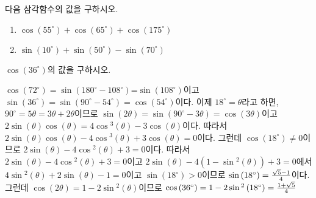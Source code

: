 \documentclass[11pt, a4paper]{book}
\begin{document}
\begin{problem}
	다음 삼각함수의 값을 구하시오.
	\begin{enumerate}[label=\arabic*)]
		\item $\cos(55^{\circ}) + \cos(65^{\circ}) + \cos(175^{\circ})$
		\item $\sin(10^{\circ}) + \sin(50^{\circ}) - \sin(70^{\circ})$
	\end{enumerate}
\end{problem}


\begin{problem}
	$\cos(36^{\circ})$의 값을 구하시오.
	{
\begin{psolution}
	$\cos\left(72^{\circ}\right)=\sin\left(180^{\circ}-108^{\circ}\right)$=$\sin\left(108^{\circ}\right)$이고 
	$\sin\left(36^{\circ}\right)=\sin\left(90^{\circ}-54^{\circ}\right)=\cos\left(54^{\circ}\right)$이다. 이제 
	$18^{\circ}=\theta$라고 하면,  $90^{\circ}=5\theta=3\theta+2\theta$이므로
	$\sin(2\theta)=\sin\left(90^{\circ}-3\theta\right)=\cos(3\theta)$이고 $2\sin(\theta)\cos(\theta)=4\cos{^3}(\theta)-3\cos(\theta)$이다. 따라서 
	$2\sin(\theta)\cos(\theta)-4\cos{^3}(\theta)+3\cos(\theta)=0$이다. 그런데 $\cos\left(18^{\circ}\right)\neq0$이므로
	$2\sin(\theta)-4\cos{^2}(\theta)+3=0$이다. 따라서
	$2\sin(\theta)-4\cos{^2}(\theta)+3=0$이고 
	$2\sin(\theta)-4\left(1-\sin{^2}(\theta)\right)+3=0$에서 $4\sin{^2}(\theta)+2\sin(\theta)-1=0$이고 $\sin\left(18^{\circ}\right)>0$이므로
	$\sin\left(18^{\circ}\right)={\sqrt{5}-1\over4}$이다. 그런데
	$\cos(2\theta)=1-2\sin{^2}(\theta)$이므로 
	$\cos\left(36^{\circ}\right)=1-2\sin{^2}\left(18^{\circ}\right)={1+\sqrt{5}\over 4}$
\end{psolution}	
}	
\end{problem}
\end{document}
